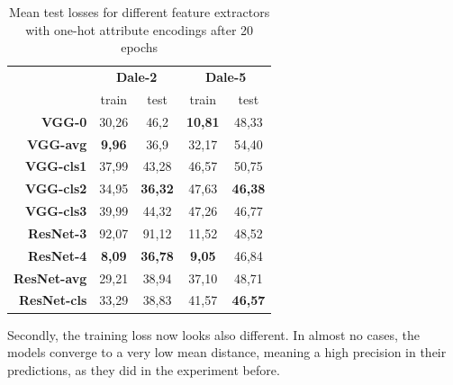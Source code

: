 \begin{table}[h]
    \centering
    \begin{tabular}{rcccc}
        \toprule
                            & \multicolumn{2}{c}{\textbf{Dale-2}} & \multicolumn{2}{c}{\textbf{Dale-5}}                                   \\\cmidrule(lr){2-3}\cmidrule(lr){4-5}
                            & train                               & test                                & train          & test           \\\midrule
        \textbf{VGG-0}      & 30,26                               & 46,2                                & \textbf{10,81} & 48,33          \\
        \textbf{VGG-avg}    & \textbf{9,96}                       & 36,9                                & 32,17          & 54,40          \\
        \textbf{VGG-cls1}   & 37,99                               & 43,28                               & 46,57          & 50,75          \\
        \textbf{VGG-cls2}   & 34,95                               & \textbf{36,32}                      & 47,63          & \textbf{46,38} \\
        \textbf{VGG-cls3}   & 39,99                               & 44,32                               & 47,26          & 46,77          \\\midrule
        \textbf{ResNet-3}   & 92,07                               & 91,12                               & 11,52          & 48,52          \\
        \textbf{ResNet-4}   & \textbf{8,09}                       & \textbf{36,78}                      & \textbf{9,05}  & 46,84          \\
        \textbf{ResNet-avg} & 29,21                               & 38,94                               & 37,10          & 48,71          \\
        \textbf{ResNet-cls} & 33,29                               & 38,83                               & 41,57          & \textbf{46,57} \\
        \bottomrule
    \end{tabular}
    \caption{Mean test losses for different feature extractors with one-hot attribute encodings after 20 epochs}
    \label{tab:feature-extractor-mean-distances}
\end{table}
Secondly, the training loss now looks also different.
In almost no cases, the models converge to a very low mean distance, meaning a high precision in their predictions, as they did in the experiment before.
